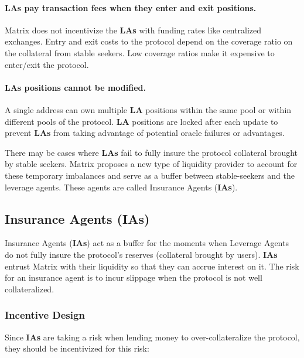 \documentclass[%
 reprint,
nofootinbib,
 amsmath,amssymb,
 aps,
]{revtex4-2}
\begin{document}

\paragraph*{\textbf{LAs} pay transaction fees when they enter and exit positions.} Matrix does not incentivize the \textbf{LAs} with funding rates like centralized exchanges. Entry and exit costs to the protocol depend on the coverage ratio on the collateral from stable seekers. Low coverage ratios make it expensive to enter/exit the protocol.  

\paragraph*{\textbf{LAs} positions cannot be modified.} A single address can own multiple \textbf{LA} positions within the same pool or within different pools of the protocol. \textbf{LA} positions are locked after each update to prevent \textbf{LAs} from taking advantage of potential oracle failures or advantages.

There may be cases where \textbf{LAs} fail to fully insure the protocol collateral brought by stable seekers. Matrix proposes a new type of liquidity provider to account for these temporary imbalances and serve as a buffer between stable-seekers and the leverage agents. These agents are called Insurance Agents (\textbf{IAs}).


\subsection{Insurance Agents (\textbf{IAs})}

Insurance Agents (\textbf{IAs}) act as a buffer for the moments when Leverage Agents do not fully insure the protocol’s reserves (collateral brought by users). \textbf{IAs} entrust Matrix with their liquidity so that they can accrue interest on it. The risk for an insurance agent is to incur slippage when the protocol is not well collateralized.

\subsubsection{Incentive Design}

Since \textbf{IAs} are taking a risk when lending money to over-collateralize the protocol, they should be incentivized for this risk:
\end{document}
